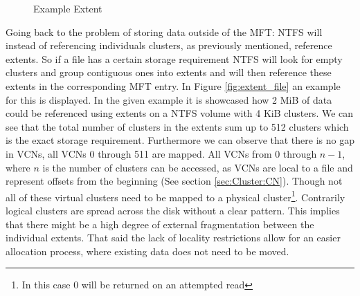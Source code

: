 \begin{figure}[h]
	\centering
	\caption{Example Extent\label{fig:extent_basic}}
\end{figure}
Going back to the problem of storing data outside of the MFT: NTFS will instead of referencing individuals clusters, as previously mentioned, reference extents. So if a file has a certain storage requirement NTFS will look for empty clusters and group contiguous ones into extents and will then reference these extents in the corresponding MFT entry. In Figure \ref{fig:extent_file} an example for this is displayed. In the given example it is showcased how 2 MiB of data could be referenced using extents on a NTFS volume with 4 KiB clusters.
We can see that the total number of clusters in the extents sum up to 512 clusters which is the exact storage requirement. Furthermore we can observe that there is no gap in VCNs, all VCNs 0 through 511 are mapped. All VCNs from 0 through $n-1$, where $n$ is the number of clusters can be accessed, as VCNs are local to a file and represent offsets from the beginning (See section \ref{sec:Cluster:CN}). Though not all of these virtual clusters need to be mapped to a physical cluster\footnote{In this case 0 will be returned on an attempted read}. Contrarily logical clusters are spread across the disk without a clear pattern.\cite{RUSSINOVICH_ET_AL:2012:WI} This implies that there might be a high degree of external fragmentation between the individual extents. That said the lack of locality restrictions allow for an easier allocation process, where existing data does not need to be moved.
